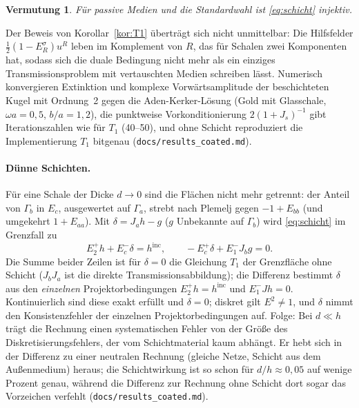 \documentclass[11pt, a4paper]{article}
\theoremstyle{plain}
\newtheorem{vermutung}[satz]{Vermutung}
\theoremstyle{definition}
\newcommand{\status}[1]{\hfill{\small\sffamily[#1]}}
\begin{document}
\begin{vermutung}\label{verm:schicht}\status{Vermutung, num.\ gestützt}
Für passive Medien und die Standardwahl ist \eqref{eq:schicht} injektiv.
\end{vermutung}
Der Beweis von Korollar~\ref{kor:T1} überträgt sich nicht unmittelbar: Die Hilfsfelder
$\tfrac12(1-E^\sigma_R)u^R$ leben im Komplement von $R$, das für Schalen zwei Komponenten hat, sodass sich die
duale Bedingung nicht mehr als ein einziges Transmissionsproblem mit vertauschten Medien schreiben lässt.
Numerisch konvergieren Extinktion und komplexe Vorwärtsamplitude der beschichteten Kugel mit Ordnung~2 gegen die
Aden-Kerker-Lösung (Gold mit Glasschale, $\omega a=0{,}5$, $b/a=1{,}2$), die punktweise Vorkonditionierung
$2(1+J_s)^{-1}$ gibt Iterationszahlen wie für $T_1$ (40--50), und ohne Schicht reproduziert die Implementierung
$T_1$ bitgenau (\texttt{docs/results\_coated.md}).

\paragraph{Dünne Schichten.} Für eine Schale der Dicke $d\to0$ sind die Flächen nicht mehr getrennt: der Anteil von
$\Gamma_b$ in $E_c$, ausgewertet auf $\Gamma_a$, strebt nach Plemelj gegen $-1+E_{bb}$ (und umgekehrt $1+E_{aa}$). Mit
$\delta=J_ah-g$ ($g$ Unbekannte auf $\Gamma_b$) wird \eqref{eq:schicht} im Grenzfall zu
\[
  E_2^+h+E_c^-\delta=h^{\mathrm{inc}},\qquad -E_c^+\delta+E_1^-J_bg=0 .
\]
Die Summe beider Zeilen ist für $\delta=0$ die Gleichung $T_1$ der Grenzfläche ohne Schicht
($J_bJ_a$ ist die direkte Transmissionsabbildung); die Differenz bestimmt $\delta$ aus den \emph{einzelnen}
Projektorbedingungen $E_2^+h=h^{\mathrm{inc}}$ und $E_1^-J h=0$. Kontinuierlich sind diese exakt erfüllt und
$\delta=0$; diskret gilt $E^2\neq1$, und $\delta$ nimmt den Konsistenzfehler der einzelnen Projektorbedingungen auf.
Folge: Bei $d\ll h$ trägt die Rechnung einen systematischen Fehler von der Größe des Diskretisierungsfehlers, der vom
Schichtmaterial kaum abhängt. Er hebt sich in der Differenz zu einer \glqq neutralen\grqq{} Rechnung (gleiche Netze,
Schicht aus dem Außenmedium) heraus; die Schichtwirkung ist so schon für $d/h\approx0{,}05$ auf wenige Prozent
genau, während die Differenz zur Rechnung ohne Schicht dort sogar das Vorzeichen verfehlt
(\texttt{docs/results\_coated.md}).
\end{document}
